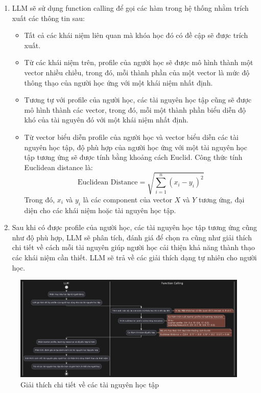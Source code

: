 \begin{enumerate}
    \item LLM sẽ sử dụng function calling để gọi các hàm trong hệ thống nhằm trích xuất các thông tin sau:
    \begin{itemize}
        \item Tất cả các khái niệm liên quan mà khóa học đó có đề cập sẽ được trích xuất.
        \item Từ các khái niệm trên, profile của người học sẽ được mô hình thành một vector nhiều chiều, trong đó, mỗi thành phần của một vector là mức độ thông thạo của người học ứng với một khái niệm nhất định.
        \item Tương tự với profile của người học, các tài nguyên học tập cũng sẽ được mô hình thành các vector, trong đó, mỗi một thành phần biểu diễn độ khó của tài nguyên đó với một khái niệm nhất định.
        \item Từ vector biểu diễn profile của người học và vector biểu diễn các tài nguyên học tập, độ phù hợp của người học ứng với một tài nguyên học tập tương ứng sẽ được tính bằng khoảng cách Euclid. Công thức tính Euclidean distance là:
    $$
    \text{Euclidean Distance} = \sqrt{\sum_{i=1}^{n} (x_i - y_i)^2}
    $$
    Trong đó, $x_i$ và $y_i$ là các component của vector $X$ và $Y$ tương ứng, đại diện cho các khái niệm hoặc tài nguyên học tập.
    \end{itemize}

    \item Sau khi có được profile của người học, các tài nguyên học tập tương ứng cũng như độ phù hợp, LLM sẽ phân tích, đánh giá để chọn ra cũng như giải thích chi tiết về cách mỗi tài nguyên giúp người học cải thiện khả năng thành thạo các khái niệm cần thiết. LLM sẽ trả về các giải thích dạng tự nhiên cho người học.
\end{enumerate}

\begin{figure}[h!]
    \centering
    \includegraphics[width=\linewidth]{Images/flowchart-diagram.png}
    \caption{Giải thích chi tiết về các tài nguyên học tập}
    \label{fig:giaithuat}
\end{figure}

